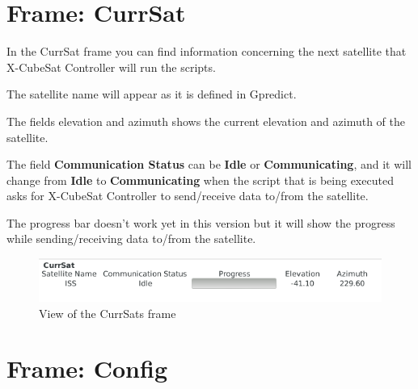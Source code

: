 \documentclass[pdftex,11pt,a4paper,titlepage]{report}
\begin{document}
\chapter{Frame: CurrSat}
\hspace{0.4cm} In the CurrSat frame you can find information concerning the next satellite that X-CubeSat Controller will run the scripts. 

The satellite name will appear as it is defined in Gpredict.

The fields elevation and azimuth shows the current elevation and azimuth of the satellite.

The field \textbf{Communication Status} can be \textbf{Idle} or \textbf{Communicating}, and it will change from \textbf{Idle} to \textbf{Communicating} when the script that is being executed asks for X-CubeSat Controller to send/receive data to/from the satellite.

The progress bar doesn't work yet in this version but it will show the progress while sending/receiving data to/from the satellite.
\begin{figure}[h]
\centering
\includegraphics[scale=0.7]{../images/CurrSatFrame.png}
\caption{View of the CurrSats frame}
\end{figure}

\chapter{Frame: Config}
\end{document}
